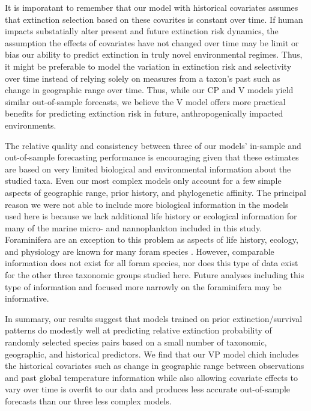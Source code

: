 \documentclass[12pt,letterpaper]{article}
\begin{document}
\begin{refsection}
It is imporatant to remember that our model with historical covariates assumes that extinction selection based on these covarites is constant over time. If human impacts substatially alter present and future extinction risk dynamics, the assumption the effects of covariates have not changed over time may be limit or bias our ability to predict extinction in truly novel environmental regimes. Thus, it might be preferable to model the variation in extinction risk and selectivity over time instead of relying solely on measures from a taxon's past such as change in geographic range over time. Thus, while our CP and V models yield similar out-of-sample forecasts, we believe the V model offers more practical benefits for predicting extinction risk in future, anthropogenically impacted environments.

The relative quality and consistency between three of our models' in-sample and out-of-sample forecasting performance is encouraging given that these estimates are based on very limited biological and environmental information about the studied taxa. Even our most complex models only account for a few simple aspects of geographic range, prior history, and phylogenetic affinity. The principal reason we were not able to include more biological information in the models used here is because we lack additional life history or ecological information for many of the marine micro- and nannoplankton included in this study. Foraminifera are an exception to this problem as aspects of life history, ecology, and physiology are known for many foram species \citep{Ezard2011}. However, comparable information does not exist for all foram species, nor does this type of data exist for the other three taxonomic groups studied here. Future analyses including this type of information and focused more narrowly on the foraminifera may be informative. 

In summary, our results suggest that models trained on prior extinction/survival patterns do modestly well at predicting relative extinction probability of randomly selected species pairs based on a small number of taxonomic, geographic, and historical predictors. We find that our VP model chich includes the historical covariates such as change in geographic range between observations and past global temperature information while also allowing covariate effects to vary over time is overfit to our data and produces less accurate out-of-sample forecasts than our three less complex models. 


\end{refsection}
\end{document}
